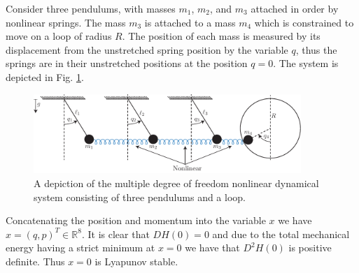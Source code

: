 \begin{ex}
	Consider three pendulums, with masses $m_1$, $m_2$, and $m_3$ attached in order by nonlinear springs. The mass $m_3$ is attached to a mass $m_4$ which is constrained to move on a loop of radius $R$. The position of each mass is measured by its displacement from the unstretched spring position by the variable $q$, thus the springs are in their unstretched positions at the position $q=0$. The system is depicted in Fig. \ref{fig:multi_dof_mech}.
\begin{figure}[h!]
	\centering
	\includegraphics[width=0.9\textwidth]{figures/ch8/17multi_dof_mech.pdf}
	\caption{A depiction of the multiple degree of freedom nonlinear dynamical system consisting of three pendulums and a loop.}
	\label{fig:multi_dof_mech}
\end{figure}

Concatenating the position and momentum into the variable $x$ we have $x=(q,p)^{T}\in \mathbb{R}^{8}$. It is clear that $DH(0) = 0$ and due to the total mechanical energy having a strict minimum at $x=0$ we have that $D^2H(0)$ is positive definite. Thus $x=0$ is Lyapunov stable.
\end{ex}

